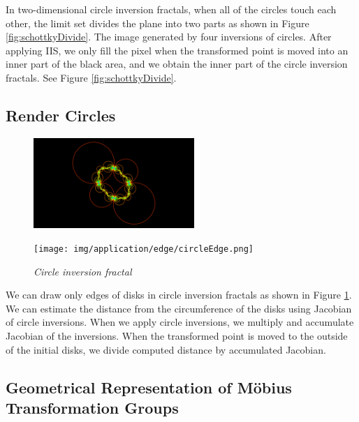 In two-dimensional circle inversion fractals,
when all of the circles touch each other, the limit set divides the plane
into two parts as shown in Figure \ref{fig:schottkyDivide}.
The image generated by four inversions of circles.
After applying IIS, we only fill the pixel when the transformed point is
moved into an inner part of the black area, and we obtain the inner part
of the circle inversion fractals. See Figure
 \ref{fig:schottkyDivide}.

\subsection{Render Circles}

\begin{figure}[htbp]
 \begin{minipage}[t]{0.5\hsize}
  \center
  \includegraphics[height=1.35in, keepaspectratio]{img/application/edge/circles.png}
  \subcaption{\textit{}}
  \label{}
  \hspace*{\fill}
 \end{minipage}
 \begin{minipage}[t]{0.5\hsize}
  \center
  \texttt{[image: img/application/edge/circleEdge.png]}
  \subcaption{\textit{}}
  \label{}
  \hspace*{\fill}
 \end{minipage}
 \caption{\textit{Circle inversion fractal}}
 \label{fig:circleEdge}
\end{figure}

We can draw only edges of disks in circle inversion fractals as shown in
Figure \ref{fig:circleEdge}.
We can estimate the distance from the circumference of the disks using Jacobian
of circle inversions.
When we apply circle inversions, we multiply and accumulate Jacobian of
the inversions.
When the transformed point is moved to the outside of the initial disks,
we divide computed distance by accumulated Jacobian.

\subsection{Geometrical Representation of M\"obius Transformation Groups}

